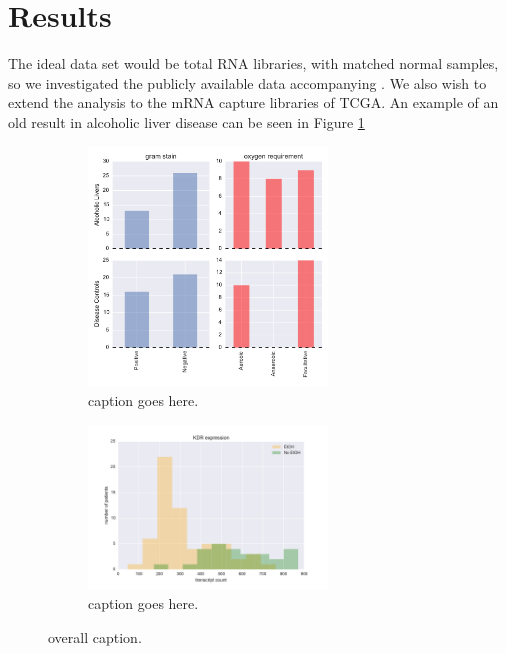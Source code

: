 \documentclass[twocolumn,11pt]{article}
\begin{document}

\section*{Results}

The ideal data set would be total RNA libraries, with matched normal samples, so we investigated the publicly available data accompanying \cite{warren2013co}.
We also wish to extend the analysis to the mRNA capture libraries of TCGA.
An example of an old result in alcoholic liver disease can be seen in Figure \ref{fig:alcoholic}

\begin{figure}
    \begin{subfigure}{0.5\textwidth}
    \centering
    \includegraphics[width=2.5in]{fig/liver_patric.pdf}
    \caption{caption goes here.}
    \end{subfigure}
    
    \begin{subfigure}{0.5\textwidth}
    \centering
    \includegraphics[width=2.5in]{fig/liver_KDR.pdf}
    \caption{caption goes here.}
    \end{subfigure}

    \caption{overall caption.}
    \label{fig:alcoholic}
\end{figure}
\end{document}
